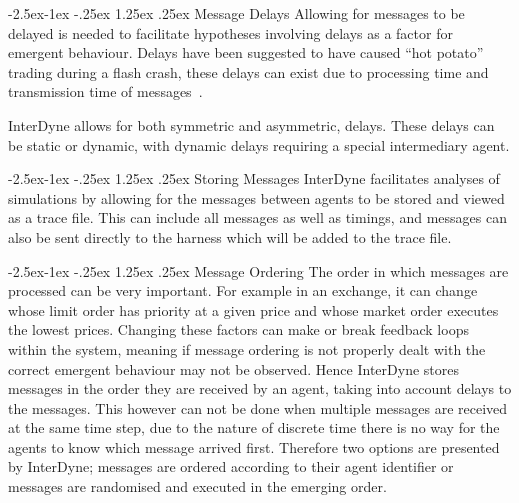 \documentclass{article}
\makeatletter
\renewcommand\paragraph{\@startsection{paragraph}{4}{\z@}%
	{-2.5ex\@plus -1ex \@minus -.25ex}%
	{1.25ex \@plus .25ex}%
	{\normalfont\normalsize\bfseries}}
\makeatother
\begin{document}
\paragraph{Message Delays}
Allowing for messages to be delayed is needed to facilitate hypotheses involving delays as a factor for emergent behaviour. Delays have been suggested to have caused ``hot potato'' trading during a flash crash, these delays can exist due to processing time and transmission time of messages~\cite{SECreport_delays}.

InterDyne allows for both symmetric and asymmetric, delays. These delays can be static or dynamic, with dynamic delays requiring a special intermediary agent. 

\paragraph{Storing Messages}
InterDyne facilitates analyses of simulations by allowing for the messages between agents to be stored and viewed as a trace file. This can include all messages as well as timings, and messages can also be sent directly to the harness which will be added to the trace file. 
  
\paragraph{Message Ordering}
The order in which messages are processed can be very important. For example in an exchange, it can change whose limit order has priority at a given price and whose market order executes the lowest prices. Changing these factors can make or break feedback loops within the system, meaning if message ordering is not properly dealt with the correct emergent behaviour may not be observed. Hence InterDyne stores messages in the order they are received by an agent, taking into account delays to the messages. This however can not be done when multiple messages are received at the same time step, due to the nature of discrete time there is no way for the agents to know which message arrived first. Therefore two options are presented by InterDyne; messages are ordered according to their agent identifier or messages are randomised and executed in the emerging order.
\end{document}
